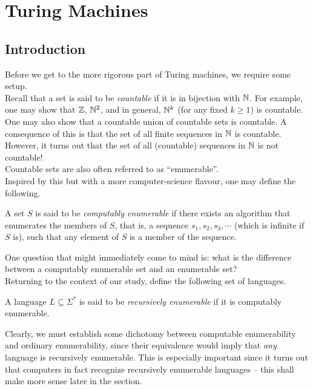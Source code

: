 \section{Turing Machines}

\subsection{Introduction}

	Before we get to the more rigorous part of Turing machines, we require some setup. \\
	Recall that a set is said to be \emph{countable} if it is in bijection with $\mathbb{N}$. For example, one may show that $\mathbb{Z}$, $\mathbb{N}^2$, and in general, $\mathbb{N}^k$ (for any fixed $k \ge 1$) is countable.\\
	One may also show that a countable union of countable sets is countable. A consequence of this is that the set of all finite sequences in $\mathbb{N}$ is countable. However, it turns out that the set of all (countable) sequences in $\mathbb{N}$ is not countable!\\
	Countable sets are also often referred to as ``enumerable''.\\

	Inspired by this but with a more computer-science flavour, one may define the following.

	\begin{fdef}
		A set $S$ is said to be \emph{computably enumerable} if there exists an algorithm that enumerates the members of $S$, that is, a sequence $s_1, s_2, s_3, \cdots$ (which is infinite if $S$ is), such that any element of $S$ is a member of the sequence.
	\end{fdef}

	One question that might immediately come to mind is: what is the difference between a computably enumerable set and an enumerable set? \\
	Returning to the context of our study, define the following set of languages.

	\begin{fdef}
		A language $L \subseteq \Sigma^*$ is said to be \emph{recursively enumerable} if it is computably enumerable.
	\end{fdef}

	Clearly, we must establish some dichotomy between computable enumerability and ordinary enumerability, since their equivalence would imply that \emph{any} language is recursively enumerable. This is especially important since it turns out that computers in fact recognize recursively enumerable languages -- this shall make more sense later in the section.


